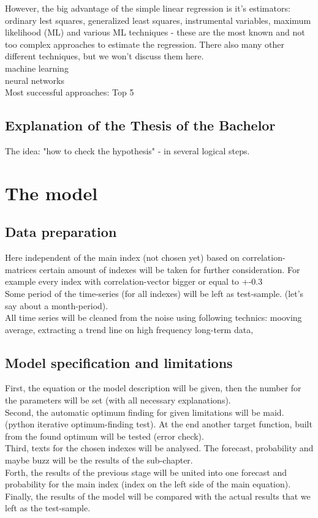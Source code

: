 \documentclass {article}
\begin{document}
However, the big advantage of the simple linear regression is it's estimators: ordinary lest squares, generalized least squares, instrumental variables, maximum likelihood (ML) and various ML techniques - these are the most known and not too complex approaches to estimate the regression. There also many other different techniques, but we won't discuss them here.\\    
machine learning\\
neural networks\\
Most successful approaches: Top 5
\subsection{Explanation of the Thesis of the Bachelor}
The idea: "how to check the hypothesis" - in several logical steps.

\newpage
\section{The model}
\subsection{Data preparation}
Here independent of the main index (not chosen yet) based on correlation-matrices certain amount of indexes will be taken for further consideration. For example every index with correlation-vector bigger or equal to +-0.3\\
Some period of the time-series (for all indexes) will be left as test-sample. (let's say about a month-period).\\
All time series will be cleaned from the noise using following technics: mooving average, extracting a trend line on high frequency long-term data, 
\subsection{Model specification and limitations}
First, the equation or the model description will be given, then the number for the parameters will be set (with all necessary explanations).\\
Second, the automatic optimum finding for given limitations will be maid. (python iterative optimum-finding test). At the end another target function, built from the found optimum will be tested (error check).\\
Third, texts for the chosen indexes will be analysed. The forecast, probability and maybe buzz will be the results of the sub-chapter.\\
Forth, the results of the previous stage will be united into one forecast and probability for the main index (index on the left side of the main equation).\\
Finally, the results of the model will be compared with the actual results that we left as the test-sample.
\end{document}
